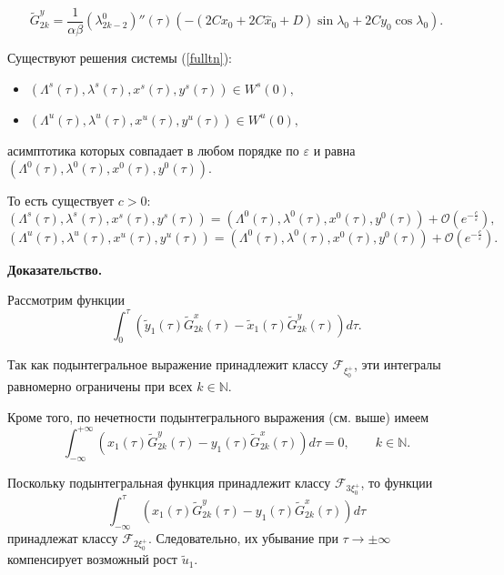 $$\tilde G_{2k}^y  = \frac{1}{\alpha \beta} (\lambda^0_{2k-2})''(\tau) \left( -(2Cx_0+2C \hat x_0+D) \sin\lambda_0 + 2Cy_0 \cos\lambda_0 \right).$$
\begin{thm}
\begin{samepage}
Существуют решения системы (\ref{fulltn}):
\begin{itemize}
\item $(\Lambda^s(\tau),\lambda^s(\tau),x^s(\tau),y^s(\tau)) \in W^s(0),$
\item $(\Lambda^u(\tau),\lambda^u(\tau),x^u(\tau),y^u(\tau)) \in W^u(0),$
\end{itemize}

асимптотика которых совпадает в любом порядке по $\varepsilon$ и равна $(\Lambda^0(\tau),\lambda^0(\tau),x^0(\tau),y^0(\tau))$.
\end{samepage}
То есть существует $c>0:$
$$(\Lambda^s(\tau),\lambda^s(\tau),x^s(\tau),y^s(\tau)) = (\Lambda^0(\tau),\lambda^0(\tau),x^0(\tau),y^0(\tau)) + \mathcal{O}(e^{-\frac{c}{\varepsilon}}),$$
$$(\Lambda^u(\tau),\lambda^u(\tau),x^u(\tau),y^u(\tau)) = (\Lambda^0(\tau),\lambda^0(\tau),x^0(\tau),y^0(\tau)) + \mathcal{O}(e^{-\frac{c}{\varepsilon}}).$$

\end{thm}
\textbf{Доказательство.}

Рассмотрим функции
\[
\int_{0}^{\tau}
\left(
\tilde y_1(\tau)\tilde G_{2k}^x(\tau)-
\tilde x_1(\tau)\tilde G_{2k}^y(\tau)
\right)d\tau .
\]

Так как подынтегральное выражение принадлежит классу
\(
\mathcal{F}_{\xi_0^+}
\),
эти интегралы равномерно ограничены при всех
\(k\in\mathbb N\).

Кроме того, по нечетности подынтегрального выражения
(см. выше) имеем
\[
\int_{-\infty}^{+\infty}
\left(
x_1(\tau)\tilde G_{2k}^y(\tau)-
y_1(\tau)\tilde G_{2k}^x(\tau)
\right)d\tau
=0,
\qquad k\in\mathbb N .
\]

Поскольку подынтегральная функция принадлежит классу
\(
\mathcal{F}_{3\xi_0^+}
\),
то функции
\[
\int_{-\infty}^{\tau}
\left(
x_1(\tau)\tilde G_{2k}^y(\tau)-
y_1(\tau)\tilde G_{2k}^x(\tau)
\right)d\tau
\]
принадлежат классу
\(
\mathcal{F}_{2\xi_0^+}
\).
Следовательно, их убывание при
\(
\tau\to\pm\infty
\)
компенсирует возможный рост
\(
\tilde u_1
\).

